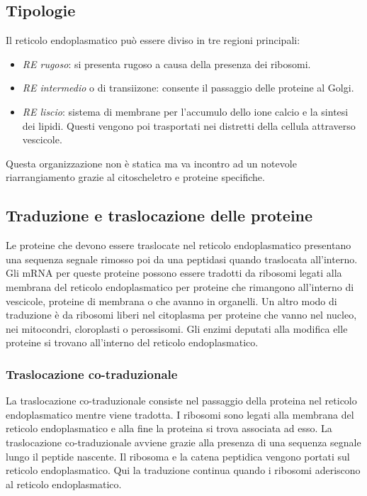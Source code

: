	\subsection{Tipologie}
	Il reticolo endoplasmatico pu\`o essere diviso in tre regioni principali:
	\begin{multicols}{2}
		\begin{itemize}
			\item \emph{RE rugoso}: si presenta rugoso a causa della presenza dei ribosomi.
			\item \emph{RE intermedio} o di transiizone: consente il passaggio delle proteine al Golgi.
			\item \emph{RE liscio}: sistema di membrane per l'accumulo dello ione calcio e la sintesi dei lipidi.
				Questi vengono poi trasportati nei distretti della cellula attraverso vescicole.
		\end{itemize}
	\end{multicols}
	Questa organizzazione non \`e statica ma va incontro ad un notevole riarrangiamento grazie al citoscheletro e proteine specifiche.

	\subsection{Traduzione e traslocazione delle proteine}
	Le proteine che devono essere traslocate nel reticolo endoplasmatico presentano una sequenza segnale rimosso poi da una peptidasi quando traslocata all'interno.
	Gli mRNA per queste proteine possono essere tradotti da ribosomi legati alla membrana del reticolo endoplasmatico per proteine che rimangono all'interno di vescicole, proteine di membrana o che avanno in organelli.
	Un altro modo di traduzione \`e da ribosomi liberi nel citoplasma per proteine che vanno nel nucleo, nei mitocondri, cloroplasti o perossisomi.
	Gli enzimi deputati alla modifica elle proteine si trovano all'interno del reticolo endoplasmatico.

		\subsubsection{Traslocazione co-traduzionale}
		La traslocazione co-traduzionale consiste nel passaggio della proteina nel reticolo endoplasmatico mentre viene tradotta.
		I ribosomi sono legati alla membrana del reticolo endoplasmatico e alla fine la proteina si trova associata ad esso.
		La traslocazione co-traduzionale avviene grazie alla presenza di una sequenza segnale lungo il peptide nascente.
		Il ribosoma e la catena peptidica vengono portati sul reticolo endoplasmatico.
		Qui la traduzione continua quando i ribosomi aderiscono al reticolo endoplasmatico.

